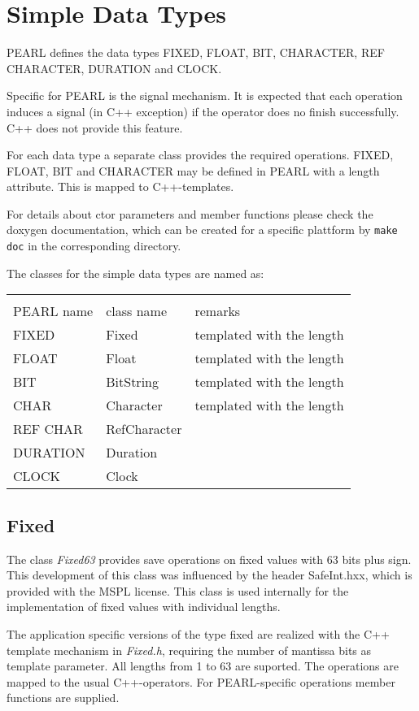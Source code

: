 \chapter{Simple Data Types}
PEARL defines the data types FIXED, FLOAT, BIT, CHARACTER, REF CHARACTER,
DURATION and CLOCK.

Specific for PEARL is the signal mechanism. It is expected that
each operation induces a signal (in C++ exception) if the operator
does no finish successfully. C++ does not provide this feature.

For each data type a separate class provides the required operations.
FIXED, FLOAT, BIT and CHARACTER may be defined in PEARL with a length
attribute. This is mapped to C++-templates.

For details about ctor parameters and member functions please check the
doxygen documentation, which can be created for a specific plattform
by \verb|make doc| in the corresponding directory.

The classes for the simple data types are named as:

\begin{tabular}{|l|l|l|}
\hline\\
PEARL name & class name & remarks\\
\hline
FIXED & Fixed & templated with the length\\
FLOAT & Float & templated with the length\\
BIT & BitString & templated with the length\\
CHAR & Character & templated with the length\\
REF CHAR & RefCharacter & \\
DURATION & Duration & \\
CLOCK & Clock & \\
\hline
\end{tabular}

\section{Fixed}
The class {\em Fixed63} provides save operations on fixed values 
with 63 bits plus sign. This development of this class was influenced by
the header SafeInt.hxx, which is provided with the MSPL license.
This class is used internally for the implementation of fixed values
with individual lengths.

The application specific versions of  the type fixed are realized with the 
C++ template mechanism in {\em Fixed.h},
 requiring the number of mantissa bits as template parameter. 
All lengths from 1 to 63 are suported.
The operations are mapped to the usual C++-operators.  
For PEARL-specific operations member functions are supplied.

